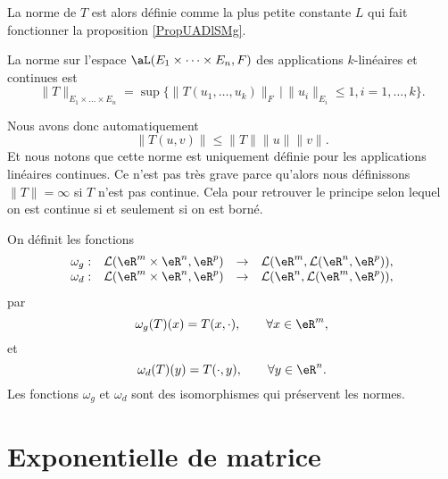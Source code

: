 La norme de \( T\) est alors définie comme la plus petite constante \( L\) qui fait fonctionner la proposition \ref{PropUADlSMg}.
\begin{definition}  \label{DefKPBYeyG}
	La norme sur l'espace $\aL(E_1\times \cdots\times E_n, F)$ des applications $k$-linéaires et continues est 
	\begin{equation}
        \|T\|_{E_1\times \ldots\times E_n}=\sup\{ \|T(u_1, \ldots,u_k)\|_{F}\,\vert\,\|u_i\|_{E_i}\leq 1, i=1,\ldots, k \}.
	\end{equation}
\end{definition}
Nous avons donc automatiquement
\begin{equation}    \label{EqYLnbRbC}
    \| T(u,v) \|\leq \| T \|\| u \|\| v \|.
\end{equation}
Et nous notons que cette norme est uniquement définie pour les applications linéaires continues. Ce n'est pas très grave parce qu'alors nous définissons \( \| T \|=\infty\) si \( T\) n'est pas continue. Cela pour retrouver le principe selon lequel on est continue si et seulement si on est borné.

\begin{proposition}\label{isom_isom}
  On définit les fonctions
  \begin{equation}
    \begin{array}{rccc}
      \omega_g: & \mathcal{L}(\eR^{m}\times\eR^{n}, \eR^p)&\to &\mathcal{L}(\eR^{m}, \mathcal{L}(\eR^{n}, \eR^p)),\\
      \omega_d: & \mathcal{L}(\eR^{m}\times\eR^{n}, \eR^p)&\to &\mathcal{L}(\eR^{n}, \mathcal{L}(\eR^{m}, \eR^p)),
    \end{array}
  \end{equation}
par 
\[
\omega_g(T)(x)=T(x,\cdot), \qquad \forall x\in\eR^m,
\]
et
\[
\omega_d(T)(y)=T(\cdot, y), \qquad \forall y\in\eR^n.
\]
Les fonctions $\omega_g$ et $\omega_d$ sont des isomorphismes qui préservent les normes.    
\end{proposition}


\section{Exponentielle de matrice}
\label{secAOnIwQM}

